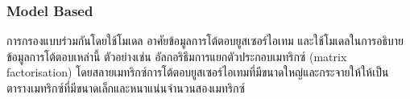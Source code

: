 \subsubsection{Model Based}
การกรองแบบร่วมกันโดยใช้โมเดล อาศัยข้อมูลการโต้ตอบยูสเซอร์ไอเทม และใช้โมเดลในการอธิบายข้อมูลการโต้ตอบเหล่านี้ ตัวอย่างเช่น อัลกอริธึมการแยกตัวประกอบเมทริกซ์ (matrix factorisation) โดยสลายเมทริกซ์การโต้ตอบยูสเซอร์ไอเทมที่มีขนาดใหญ่และกระจายให้ให้เป็นตารางเมทริกซ์ที่มีขนาดเล็กและหนาแน่นจำนวนสองเมทริกซ์
\pagebreak
    

